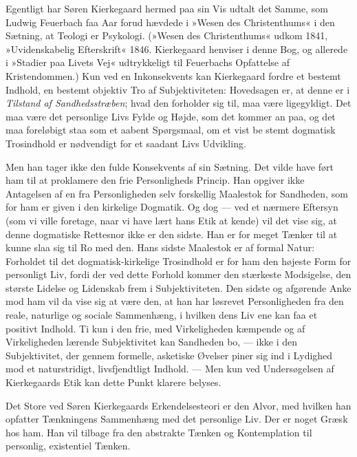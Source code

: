 \documentclass[12pt,a4paper,openany]{book}
\newcommand{\opage}[1]{\marginnote{\footnotesize\textit{[#1]}}}
\begin{document}
Egentligt har Søren Kierkegaard hermed paa sin Vis
udtalt det Samme, som Ludwig Feuerbach faa Aar forud
hævdede i »Wesen des Christenthums« i den Sætning, at
Teologi er Psykologi. (»Wesen des Christenthums« udkom
1841, »Uvidenskabelig Efterskrift« 1846. Kierkegaard
henviser i denne Bog, og allerede i »Stadier paa
Livets Vej« udtrykkeligt til Feuerbachs Opfattelse af
Kristendommen.) Kun ved en Inkonsekvents kan Kierkegaard
fordre et bestemt Indhold, en bestemt objektiv Tro
af Subjektiviteten: Hovedsagen er, at denne er i \textit{Tilstand
af Sandhedsstræben}; hvad den forholder sig til, maa
være ligegyldigt. Det maa være det personlige Livs
Fylde og Højde, som det kommer an paa, og det maa
foreløbigt staa som et aabent Spørgsmaal, om et vist be%
\opage{69}stemt dogmatisk Trosindhold er nødvendigt for et saadant
Livs Udvikling.

Men han tager ikke den fulde Konsekvents af sin
Sætning. Det vilde have ført ham til at proklamere den
frie Personligheds Princip. Han opgiver ikke Antagelsen
af en fra Personligheden selv forskellig Maalestok for
Sandheden, som for ham er given i den kirkelige Dogmatik.
Og dog --- ved et nærmere Eftersyn (som vi ville
foretage, naar vi have lært hans Etik at kende) vil det
vise sig, at denne dogmatiske Rettesnor ikke er den
sidste. Han er for meget Tænker til at kunne slaa sig
til Ro med den. Hans sidste Maalestok er af formal
Natur: Forholdet til det dogmatisk-kirkelige Trosindhold
er for ham den højeste Form for personligt Liv, fordi
der ved dette Forhold kommer den stærkeste Modsigelse,
den største Lidelse og Lidenskab frem i Subjektiviteten.
Den sidste og afgørende Anke mod ham vil da vise sig
at være den, at han har løsrevet Personligheden fra den
reale, naturlige og sociale Sammenhæng, i hvilken dens
Liv ene kan faa et positivt Indhold. Ti kun i den frie,
med Virkeligheden kæmpende og af Virkeligheden lærende
Subjektivitet kan Sandheden bo, --- ikke i den Subjektivitet,
der gennem formelle, asketiske Øvelser piner sig ind
i Lydighed mod et naturstridigt, livsfjendtligt Indhold.
--- Men kun ved Undersøgelsen af Kierkegaards Etik
kan dette Punkt klarere belyses.

Det Store ved Søren Kierkegaards Erkendelsesteori
er den Alvor, med hvilken han opfatter Tænkningens
Sammenhæng med det personlige Liv. Der er noget
Græsk hos ham. Han vil tilbage fra den abstrakte
Tænken og Kontemplation til personlig, existentiel
Tænken.
\end{document}
